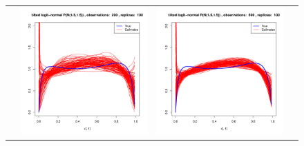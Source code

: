 \begin{figure}[h]
\begin{tabular}{cccc}
	&
	\includegraphics[width=\textwidth/4]{../img/logitnormal/tilted/K1/densities/n200_R100.pdf}
	&
	\includegraphics[width=\textwidth/4]{../img/logitnormal/tilted/K1/densities/n500_R100.pdf}\\
	

\end{tabular}
\end{figure}
